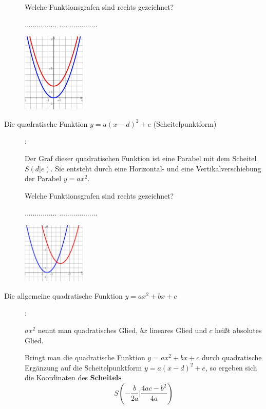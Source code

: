 \documentclass[a4paper, twoside, parskip, 10pt, smallheadings]{scrbook}
\theoremstyle{plain}
\theoremstyle{definition}
\begin{document}
\begin{description}
\begin{minipage}{11cm}
	Welche Funktionsgrafen sind rechts gezeichnet?

	$................$ $...................$
	\end{minipage} 
	\begin{minipage}{3cm}
	\includegraphics[width=3cm]{2te/quadratischefunktion/bilder/allgquadftvertikaleverschiebung.jpg}
	\end{minipage}

\item[Die quadratische Funktion $y=a(x-d)^2+e$ (Scheitelpunktform)]:

	\begin{minipage}{11cm}
	Der Graf dieser quadratischen Funktion ist eine Parabel mit dem Scheitel $S(d|e)$. Sie entsteht durch eine Horizontal- und eine Vertikalverschiebung  der Parabel $y=ax^2$.

	Welche Funktionsgrafen sind rechts gezeichnet?

	$................$ $...................$
	\end{minipage} 
	\begin{minipage}{3cm}
	\includegraphics[width=3cm]{2te/quadratischefunktion/bilder/allgquadfthorizontaleundvertikaleverschiebung.jpg}
	\end{minipage}


\item [Die allgemeine quadratische Funktion $y=ax^2+bx+c$]:
	
	\begin{minipage}{11cm}
	$ax^2$ nennt man quadratisches Glied, $bx$ lineares Glied und $c$ heißt absolutes Glied.

	Bringt man die quadratische Funktion $y=ax^2+bx+c$ durch quadratische Ergänzung auf die Scheitelpunktform $y=a(x-d)^2+e$, so ergeben sich die Koordinaten des {\bf Scheitels} $$S\left(-\frac{b}{2a}|\frac{4ac-b^2}{4a}\right)$$


\end{minipage}
\end{description}
\end{document}
